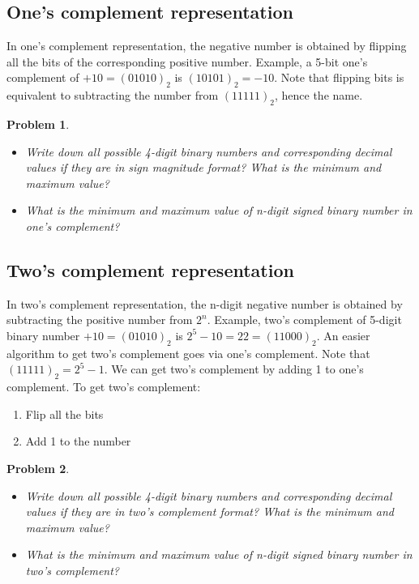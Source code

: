\documentclass{article}
\newtheorem{prob}{Problem}
\begin{document}
\subsection{One's complement representation}

In one's complement representation, the negative number is obtained by flipping
all the bits of the corresponding positive number. Example, a 5-bit one's
complement of $+10 = (01010)_2$ is $(10101)_2 = -10$. Note that flipping bits is
equivalent to subtracting the number from $(11111)_2$, hence the name.

\begin{prob}
  \begin{itemize}
  \item Write down all possible 4-digit binary numbers and corresponding decimal
    values if they are in sign magnitude format? What is the minimum and maximum value?
  \item What is the minimum and maximum value of n-digit signed binary number in
    one's complement?
  \end{itemize}
\end{prob}
\vspace{20em}

\subsection{Two's complement representation}

In two's complement representation, the n-digit negative number is obtained by
subtracting the positive number from $2^{n}$. Example, two's
complement of 5-digit binary number $+10 = (01010)_2$ is $2^5 - 10 = 22 =
(11000)_2$. An easier algorithm to get two's complement goes via one's
complement. Note that $(11111)_2 = 2^5-1$. We can get two's complement by adding
1 to one's complement. To get two's complement:
\begin{enumerate}
  \item Flip all the bits
  \item Add 1 to the number
\end{enumerate}

\begin{prob}
  \begin{itemize}
  \item Write down all possible 4-digit binary numbers and corresponding decimal
    values if they are in two's complement format? What is the minimum and maximum value?
  \item What is the minimum and maximum value of n-digit signed binary number in
    two's complement?
  \end{itemize}
\end{prob}
\vspace{20em}
\end{document}
